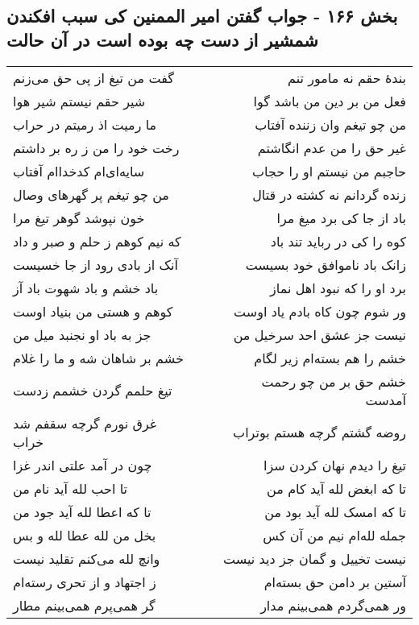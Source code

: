 \begin{center}
\section*{بخش ۱۶۶ - جواب گفتن امیر الممنین کی سبب افکندن شمشیر از دست چه بوده است  در آن حالت}
\label{sec:sh166}
\begin{longtable}{l p{0.5cm} r}
گفت من تیغ از پی حق می‌زنم
&&
بندهٔ حقم نه مامور تنم
\\
شیر حقم نیستم شیر هوا
&&
فعل من بر دین من باشد گوا
\\
ما رمیت اذ رمیتم در حراب
&&
من چو تیغم وان زننده آفتاب
\\
رخت خود را من ز ره بر داشتم
&&
غیر حق را من عدم انگاشتم
\\
سایه‌ای‌ام کدخداام آفتاب
&&
حاجبم من نیستم او را حجاب
\\
من چو تیغم پر گهرهای وصال
&&
زنده گردانم نه کشته در قتال
\\
خون نپوشد گوهر تیغ مرا
&&
باد از جا کی برد میغ مرا
\\
که نیم کوهم ز حلم و صبر و داد
&&
کوه را کی در رباید تند باد
\\
آنک از بادی رود از جا خسیست
&&
زانک باد ناموافق خود بسیست
\\
باد خشم و باد شهوت باد آز
&&
برد او را که نبود اهل نماز
\\
کوهم و هستی من بنیاد اوست
&&
ور شوم چون کاه بادم یاد اوست
\\
جز به باد او نجنبد میل من
&&
نیست جز عشق احد سرخیل من
\\
خشم بر شاهان شه و ما را غلام
&&
خشم را هم بسته‌ام زیر لگام
\\
تیغ حلمم گردن خشمم زدست
&&
خشم حق بر من چو رحمت آمدست
\\
غرق نورم گرچه سقفم شد خراب
&&
روضه گشتم گرچه هستم بوتراب
\\
چون در آمد علتی اندر غزا
&&
تیغ را دیدم نهان کردن سزا
\\
تا احب لله آید نام من
&&
تا که ابغض لله آید کام من
\\
تا که اعطا لله آید جود من
&&
تا که امسک لله آید بود من
\\
بخل من لله عطا لله و بس
&&
جمله لله‌ام نیم من آن کس
\\
وانچ لله می‌کنم تقلید نیست
&&
نیست تخییل و گمان جز دید نیست
\\
ز اجتهاد و از تحری رسته‌ام
&&
آستین بر دامن حق بسته‌ام
\\
گر همی‌پرم همی‌بینم مطار
&&
ور همی‌گردم همی‌بینم مدار
\\

\end{longtable}
\end{center}
